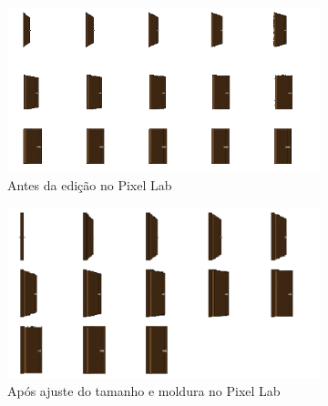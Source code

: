 \begin{figure}[htbp]
    \centering
    \caption{\small Processo de edição no Pixel Lab do sprite sheet da porta gerado pelo Gemini Pro}
    \label{fig:pixelLabFinalPortaSideViewGemini}
    \begin{subfigure}{0.7\linewidth}
        \centering
        \includegraphics[width=1\linewidth]{figs/geminiPro/sprite sheet/side_door_pixel.png}
        \caption{\small Antes da edição no Pixel Lab}
        \label{fig:pixelLabFinalPortaSideViewGeminiAntes}
    \end{subfigure}
    \begin{subfigure}{0.7\linewidth}
        \centering
        \includegraphics[width=1\linewidth]{figs/pixelLab/final/side_door_pixel_correcao.png}
        \caption{\small Após ajuste do tamanho e moldura no Pixel Lab}
        \label{fig:pixelLabFinalSideViewGemini1}
    \end{subfigure}
    \begin{subfigure}{0.5\linewidth}
        \centering

\end{subfigure}
\end{figure}
